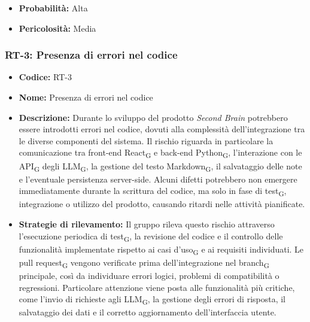 ﻿\documentclass[a4paper, 10pt, colorlinks=true, linkcolor=black, urlcolor=blue, citecolor=blue, hidelinks]{article}
\begin{document}
\begin{itemize}
    \item \textbf{Probabilità:} Alta

    \item \textbf{Pericolosità:} Media
\end{itemize}


\subsubsection{RT-3: Presenza di errori nel codice}

\begin{itemize}
    \item \textbf{Codice:} RT-3

    \item \textbf{Nome:} Presenza di errori nel codice

    \item \textbf{Descrizione:} Durante lo sviluppo del prodotto \textit{Second Brain} potrebbero essere introdotti errori nel codice, dovuti alla complessità dell'integrazione tra le diverse componenti del sistema. Il rischio riguarda in particolare la comunicazione tra front-end React\textsubscript{G} e back-end Python\textsubscript{G}, l'interazione con le API\textsubscript{G} degli LLM\textsubscript{G}, la gestione del testo Markdown\textsubscript{G}, il salvataggio delle note e l'eventuale persistenza server-side. Alcuni difetti potrebbero non emergere immediatamente durante la scrittura del codice, ma solo in fase di test\textsubscript{G}, integrazione o utilizzo del prodotto, causando ritardi nelle attività pianificate.

    \item \textbf{Strategie di rilevamento:} Il gruppo rileva questo rischio attraverso l'esecuzione periodica di test\textsubscript{G}, la revisione del codice e il controllo delle funzionalità implementate rispetto ai casi d'uso\textsubscript{G} e ai requisiti individuati. Le pull request\textsubscript{G} vengono verificate prima dell'integrazione nel branch\textsubscript{G} principale, così da individuare errori logici, problemi di compatibilità o regressioni. Particolare attenzione viene posta alle funzionalità più critiche, come l'invio di richieste agli LLM\textsubscript{G}, la gestione degli errori di risposta, il salvataggio dei dati e il corretto aggiornamento dell'interfaccia utente.


\end{itemize}
\end{document}
